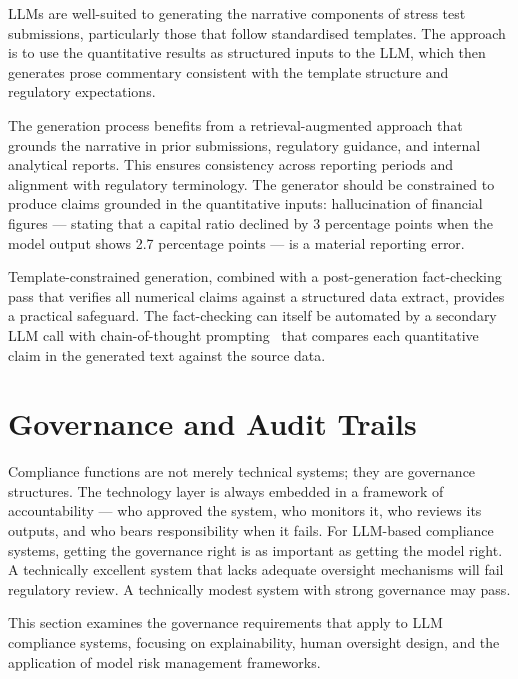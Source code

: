 LLMs are well-suited to generating the narrative components of stress test submissions, particularly those that follow standardised templates. The approach is to use the quantitative results as structured inputs to the LLM, which then generates prose commentary consistent with the template structure and regulatory expectations.

The generation process benefits from a retrieval-augmented approach that grounds the narrative in prior submissions, regulatory guidance, and internal analytical reports. This ensures consistency across reporting periods and alignment with regulatory terminology. The generator should be constrained to produce claims grounded in the quantitative inputs: hallucination of financial figures --- stating that a capital ratio declined by 3 percentage points when the model output shows 2.7 percentage points --- is a material reporting error.

Template-constrained generation, combined with a post-generation fact-checking pass that verifies all numerical claims against a structured data extract, provides a practical safeguard. The fact-checking can itself be automated by a secondary LLM call with chain-of-thought prompting~\cite{wei2022chain} that compares each quantitative claim in the generated text against the source data.

\section{Governance and Audit Trails}
\label{sec:ch11-governance-audit}

\begin{context}
Compliance functions are not merely technical systems; they are governance structures. The technology layer is always embedded in a framework of accountability --- who approved the system, who monitors it, who reviews its outputs, and who bears responsibility when it fails. For LLM-based compliance systems, getting the governance right is as important as getting the model right. A technically excellent system that lacks adequate oversight mechanisms will fail regulatory review. A technically modest system with strong governance may pass.

This section examines the governance requirements that apply to LLM compliance systems, focusing on explainability, human oversight design, and the application of model risk management frameworks.
\end{context}


